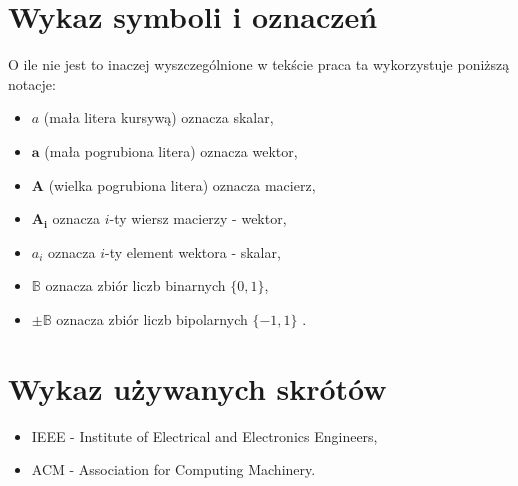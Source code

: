 \documentclass[a4paper,12pt,titlepage]{report}
\begin{document}

\newpage
{}
\listoffigures

\newpage
{}
\listoftables

\newpage
\chapter*{Wykaz symboli i oznaczeń}
O ile nie jest to inaczej wyszczególnione w tekście praca ta wykorzystuje poniższą notacje:
\begin{itemize}
    \item $a$ (mała litera kursywą) oznacza skalar,
    \item $\bm{a}$ (mała pogrubiona litera) oznacza wektor, 
    \item $\bm{A}$ (wielka pogrubiona litera) oznacza macierz,
    \item $\bm{A_i}$ oznacza $i$-ty wiersz macierzy - wektor,
    \item $a_i$ oznacza $i$-ty element wektora - skalar,

    \item $\mathbb{B}$ oznacza zbiór liczb binarnych $\{0, 1\}$,
    \item $\pm \mathbb{B}$ oznacza zbiór liczb bipolarnych $\{-1, 1\}$
    .
\end{itemize}

\newpage
\chapter*{Wykaz używanych skrótów}
\begin{itemize}
    \item IEEE - Institute of Electrical and Electronics Engineers,
    \item ACM - Association for Computing Machinery.
\end{itemize}

\clearpage
{}



\end{document}

